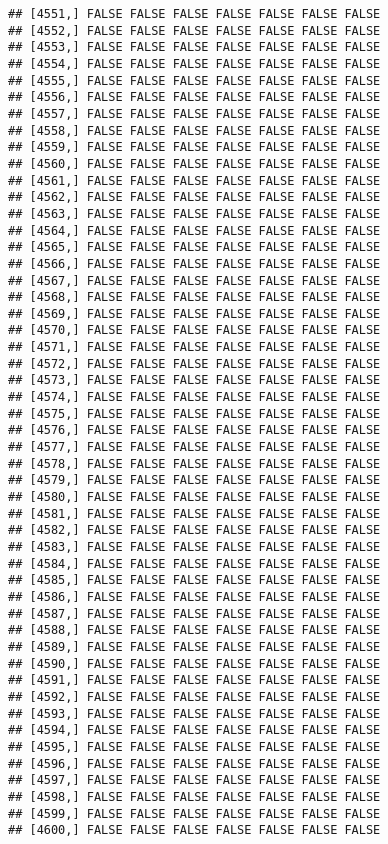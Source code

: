 \documentclass[
]{article}
\begin{document}
\begin{verbatim}
## [4551,] FALSE FALSE FALSE FALSE FALSE FALSE FALSE
## [4552,] FALSE FALSE FALSE FALSE FALSE FALSE FALSE
## [4553,] FALSE FALSE FALSE FALSE FALSE FALSE FALSE
## [4554,] FALSE FALSE FALSE FALSE FALSE FALSE FALSE
## [4555,] FALSE FALSE FALSE FALSE FALSE FALSE FALSE
## [4556,] FALSE FALSE FALSE FALSE FALSE FALSE FALSE
## [4557,] FALSE FALSE FALSE FALSE FALSE FALSE FALSE
## [4558,] FALSE FALSE FALSE FALSE FALSE FALSE FALSE
## [4559,] FALSE FALSE FALSE FALSE FALSE FALSE FALSE
## [4560,] FALSE FALSE FALSE FALSE FALSE FALSE FALSE
## [4561,] FALSE FALSE FALSE FALSE FALSE FALSE FALSE
## [4562,] FALSE FALSE FALSE FALSE FALSE FALSE FALSE
## [4563,] FALSE FALSE FALSE FALSE FALSE FALSE FALSE
## [4564,] FALSE FALSE FALSE FALSE FALSE FALSE FALSE
## [4565,] FALSE FALSE FALSE FALSE FALSE FALSE FALSE
## [4566,] FALSE FALSE FALSE FALSE FALSE FALSE FALSE
## [4567,] FALSE FALSE FALSE FALSE FALSE FALSE FALSE
## [4568,] FALSE FALSE FALSE FALSE FALSE FALSE FALSE
## [4569,] FALSE FALSE FALSE FALSE FALSE FALSE FALSE
## [4570,] FALSE FALSE FALSE FALSE FALSE FALSE FALSE
## [4571,] FALSE FALSE FALSE FALSE FALSE FALSE FALSE
## [4572,] FALSE FALSE FALSE FALSE FALSE FALSE FALSE
## [4573,] FALSE FALSE FALSE FALSE FALSE FALSE FALSE
## [4574,] FALSE FALSE FALSE FALSE FALSE FALSE FALSE
## [4575,] FALSE FALSE FALSE FALSE FALSE FALSE FALSE
## [4576,] FALSE FALSE FALSE FALSE FALSE FALSE FALSE
## [4577,] FALSE FALSE FALSE FALSE FALSE FALSE FALSE
## [4578,] FALSE FALSE FALSE FALSE FALSE FALSE FALSE
## [4579,] FALSE FALSE FALSE FALSE FALSE FALSE FALSE
## [4580,] FALSE FALSE FALSE FALSE FALSE FALSE FALSE
## [4581,] FALSE FALSE FALSE FALSE FALSE FALSE FALSE
## [4582,] FALSE FALSE FALSE FALSE FALSE FALSE FALSE
## [4583,] FALSE FALSE FALSE FALSE FALSE FALSE FALSE
## [4584,] FALSE FALSE FALSE FALSE FALSE FALSE FALSE
## [4585,] FALSE FALSE FALSE FALSE FALSE FALSE FALSE
## [4586,] FALSE FALSE FALSE FALSE FALSE FALSE FALSE
## [4587,] FALSE FALSE FALSE FALSE FALSE FALSE FALSE
## [4588,] FALSE FALSE FALSE FALSE FALSE FALSE FALSE
## [4589,] FALSE FALSE FALSE FALSE FALSE FALSE FALSE
## [4590,] FALSE FALSE FALSE FALSE FALSE FALSE FALSE
## [4591,] FALSE FALSE FALSE FALSE FALSE FALSE FALSE
## [4592,] FALSE FALSE FALSE FALSE FALSE FALSE FALSE
## [4593,] FALSE FALSE FALSE FALSE FALSE FALSE FALSE
## [4594,] FALSE FALSE FALSE FALSE FALSE FALSE FALSE
## [4595,] FALSE FALSE FALSE FALSE FALSE FALSE FALSE
## [4596,] FALSE FALSE FALSE FALSE FALSE FALSE FALSE
## [4597,] FALSE FALSE FALSE FALSE FALSE FALSE FALSE
## [4598,] FALSE FALSE FALSE FALSE FALSE FALSE FALSE
## [4599,] FALSE FALSE FALSE FALSE FALSE FALSE FALSE
## [4600,] FALSE FALSE FALSE FALSE FALSE FALSE FALSE

\end{verbatim}
\end{document}
